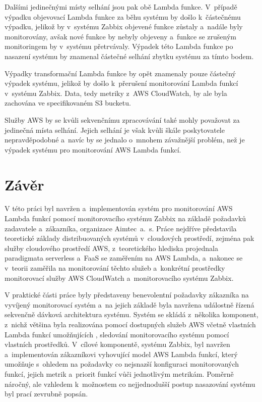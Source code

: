\documentclass[czech, ing, kiv, he, iso690]{fasthesis}
\begin{document}
Dalšími jedinečnými místy selhání jsou pak obě Lambda funkce. V~případě výpadku objevovací Lambda funkce za běhu systému by došlo k~částečnému výpadku, jelikož by v~systému Zabbix objevené funkce zůstaly a~nadále byly monitorovány, avšak nové funkce by nebyly objeveny a~funkce se zrušeným monitoringem by v~systému přetrvávaly. Výpadek této Lambda funkce po nasazení systému by znamenal částečné selhání zbytku systému za tímto bodem. 

Výpadky transformační Lambda funkce by opět znamenaly pouze částečný výpadek systému, jelikož by došlo k~přerušení monitorování Lambda funkcí v~systému Zabbix. Data, tedy metriky z~AWS CloudWatch, by ale byla zachována ve specifikovaném S3 bucketu. 

Služby AWS by se kvůli sekvenčnímu zpracovávání také mohly považovat za jedinečná místa selhání. Jejich selhání je však kvůli škále poskytovatele nepravděpodobné a~navíc by se jednalo o~mnohem závažnější problém, než je výpadek systému pro monitorování AWS Lambda funkcí.

\chapter{Závěr}

V této práci byl navržen a~implementován systém pro monitorování AWS Lambda funkcí pomocí monitorovacího systému Zabbix na základě požadavků zadavatele a~zákazníka, organizace Aimtec~a.~s. Práce nejdříve představila teoretické základy distribuovaných systémů v~cloudových prostředí, zejména pak služby cloudového prostředí AWS, z~teoretického hlediska projednala paradigmata serverless a~FaaS se zaměřením na AWS Lambda, a~nakonec se v~teorii zaměřila na monitorování těchto služeb a~konkrétní prostředky monitorovací služby AWS CloudWatch a~monitorovacího systému Zabbix. 

V praktické části práce byly představeny benevolentní požadavky zákazníka na vyvíjený monitorovací systém a~na jejich základě byla navržena událostně řízená sekvenčně dávková architektura systému. Systém se skládá z~několika komponent, z~nichž většina byla realizována pomocí dostupných služeb AWS včetně vlastních Lambda funkcí umožňujících , sledování monitorovacího systému pomocí vlastních prostředků. V~cílové komponentě, systému Zabbix, byl navržen a~implementován zákazníkovi vyhovující model AWS Lambda funkcí, který umožňuje s~ohledem na požadavky co nejsnazší konfiguraci monitorovaných funkcí, jejich metrik a~priorit funkcí vůči jednotlivým metrikám. Poměrně náročný, ale vzhledem k~možnostem co nejjednodušší postup nasazování systému byl prací zevrubně popsán.
\end{document}
